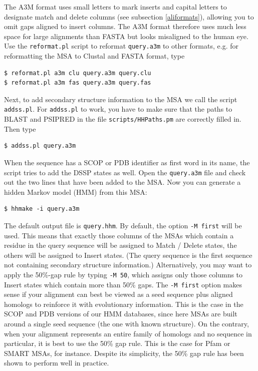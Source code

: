 \documentclass[11pt,a4paper]{article}
\begin{document}
The A3M format uses small letters to mark inserts and capital letters to designate match and delete columns (see subsection \ref{aliformats}), allowing you to omit gaps aligned to insert columns. The A3M format therefore uses much less space for large alignments than FASTA but looks misaligned to the human eye. Use the \verb`reformat.pl` script to reformat \verb`query.a3m` to other formats, e.g. for reformatting the MSA to Clustal and FASTA format, type
\begin{verbatim}
$ reformat.pl a3m clu query.a3m query.clu
$ reformat.pl a3m fas query.a3m query.fas
\end{verbatim}

Next, to add secondary structure information to the MSA we call the script \verb`addss.pl`. For \verb`addss.pl` to work, you have to make sure that the paths to BLAST and PSIPRED in the file \verb`scripts/HHPaths.pm` are correctly filled in. Then type
\begin{verbatim}
$ addss.pl query.a3m
\end{verbatim}
When the sequence has a SCOP or PDB identifier as first word in its name, the script tries to add the DSSP states as well. Open the \verb`query.a3m` file and check out the two lines that have been added to the MSA. Now you can generate a hidden Markov model (HMM) from this MSA:
\begin{verbatim}
$ hhmake -i query.a3m
\end{verbatim}
The default output file is \verb`query.hhm`. By default, the option \verb`-M first` will 
be used. This means that exactly those columns of 
the MSAs which contain a residue in the query sequence will be assigned to Match 
/ Delete states, the others will be assigned to Insert states. (The query sequence is 
the first sequence not containing secondary structure information.) Alternatively, you 
may want to apply the 50\%-gap rule by typing \verb`-M 50`, which assigns only those columns 
to Insert states which contain more than 50\% gaps. The \verb`-M first` option makes sense 
if your alignment can best be viewed as a seed sequence plus aligned homologs to 
reinforce it with evolutionary information. This is the case in the SCOP and PDB 
versions of our HMM databases, since here MSAs are built around a single seed 
sequence (the one with known structure). On the contrary, when your alignment 
represents an entire family of homologs and no sequence in particular, it is best to 
use the 50\% gap rule. This is the case for Pfam or SMART MSAs, for instance. 
Despite its simplicity, the 50\% gap rule has been shown to perform well in practice.
\end{document}
